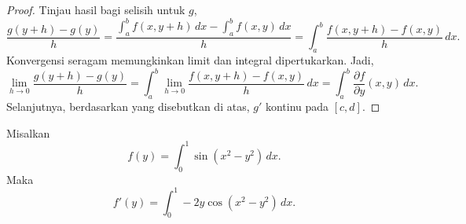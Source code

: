 \begin{proof}
Tinjau hasil bagi selisih untuk $g$,
\begin{equation*}
\frac{g(y+h)-g(y)}{h}
=
\frac{\int_a^b f(x,y+h) \,dx -
\int_a^b f(x,y) \,dx }{h}
=
\int_a^b \frac{f(x,y+h)-f(x,y)}{h} \,dx .
\end{equation*}
Konvergensi seragam memungkinkan limit dan integral dipertukarkan.
Jadi,
\begin{equation*}
\lim_{h\to 0}
\frac{g(y+h)-g(y)}{h}
= 
\int_a^b 
\lim_{h\to 0}
\frac{f(x,y+h)-f(x,y)}{h} \,dx 
=
\int_a^b 
\frac{\partial f}{\partial y}(x,y) \,dx .
\end{equation*}
Selanjutnya, berdasarkan
 yang disebutkan di atas,
$g'$ kontinu pada $[c,d]$.
\end{proof}

\begin{example}
Misalkan
\begin{equation*}
f(y) = \int_0^1 \sin(x^2-y^2) \,dx .
\end{equation*}
Maka
\begin{equation*}
f'(y) = \int_0^1 -2y\cos(x^2-y^2) \,dx .
\end{equation*}
\end{example}

